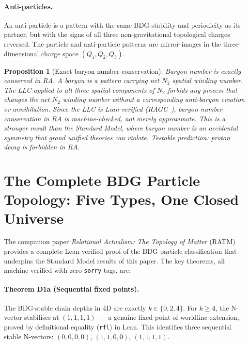 \documentclass[11pt,a4paper]{article}
\newtheorem{proposition}[theorem]{Proposition}
\begin{document}
\paragraph{Anti-particles.}
An anti-particle is a pattern with the same BDG stability and periodicity
as its partner, but with the signs of all three non-gravitational topological
charges reversed. The particle and anti-particle patterns are
mirror-images in the three-dimensional charge space $(Q_1, Q_2, Q_3)$.

\begin{proposition}[Exact baryon number conservation]
\label{prop:baryon}
Baryon number is exactly conserved in RA. A baryon is a pattern carrying
net $N_2$ spatial winding number. The LLC applied to all three spatial
components of $N_2$ forbids any process that changes the net $N_2$ winding
number without a corresponding anti-baryon creation or annihilation.
Since the LLC is Lean-verified (RAGC~\citep{Sandeman2026RAGC}), baryon
number conservation in RA is machine-checked, not merely approximate.
This is a stronger result than the Standard Model, where baryon number
is an accidental symmetry that grand unified theories can violate.
\emph{Testable prediction:} proton decay is forbidden in RA.
\end{proposition}


\section{The Complete BDG Particle Topology: Five Types, One Closed Universe}
\label{sec:topology_of_matter}

The companion paper \emph{Relational Actualism: The Topology of Matter}
(RATM)~\citep{Sandeman2026RATM} provides a complete Lean-verified proof
of the BDG particle classification that underpins the Standard Model
results of this paper.
The key theorems, all machine-verified with zero \texttt{sorry} tags, are:

\paragraph{Theorem D1a (Sequential fixed points).}
The BDG-stable chain depths in 4D are exactly $k \in \{0,2,4\}$.
For $k \geq 4$, the N-vector stabilises at $(1,1,1,1)$~--- a genuine
fixed point of worldline extension, proved by definitional equality
(\texttt{rfl}) in Lean. This identifies three sequential stable
N-vectors: $(0,0,0,0)$, $(1,1,0,0)$, $(1,1,1,1)$.
\end{document}
